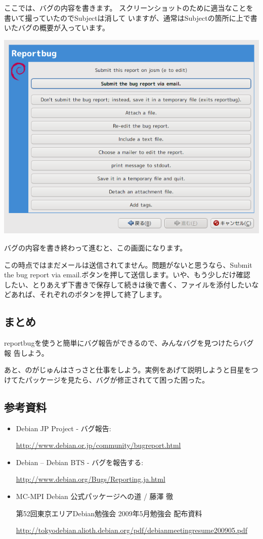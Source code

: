 \documentclass[mingoth,a4paper]{jsarticle}
\begin{document}
ここでは、バグの内容を書きます。
スクリーンショットのために適当なことを書いて撮っていたのでSubjectは消して
いますが、通常はSubjectの箇所に上で書いたバグの概要が入っています。

\includegraphics[scale=0.5]{image200909/reportbug-7.png}

バグの内容を書き終わって進むと、この画面になります。

この時点ではまだメールは送信されてません。問題がないと思うなら、Submit
the bug report via email.ボタンを押して送信します。いや、もう少しだけ確認
したい、とりあえず下書きで保存して続きは後で書く、ファイルを添付したいな
どあれば、それぞれのボタンを押して終了します。

\subsection{まとめ}
reportbugを使うと簡単にバグ報告ができるので、みんなバグを見つけたらバグ報
告しよう。

あと、のがじゅんはさっさと仕事をしよう。実例をあげて説明しようと目星をつ
けてたパッケージを見たら、バグが修正されてて困った困った。

\subsection{参考資料}

\begin{itemize}
 \item Debian JP Project - バグ報告:

\url{http://www.debian.or.jp/community/bugreport.html}

\item Debian -- Debian BTS - バグを報告する:

\url{http://www.debian.org/Bugs/Reporting.ja.html}

\item MC-MPI Debian 公式パッケージへの道 / 藤澤 徹

第52回東京エリアDebian勉強会 2009年5月勉強会 配布資料

\url{http://tokyodebian.alioth.debian.org/pdf/debianmeetingresume200905.pdf}

\end{itemize}
\end{document}
